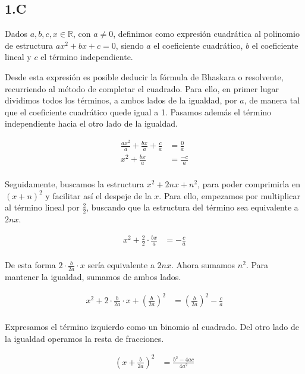 \subsection*{1.C}

Dados $a, b, c, x \in \mathbb{R}$, con $a \neq 0$, definimos como expresión cuadrática al polinomio de estructura $ax^2 + bx + c = 0$, siendo $a$ el coeficiente cuadrático, $b$ el coeficiente lineal y $c$ el término independiente.

Desde esta expresión es posible deducir la fórmula de Bhaskara o resolvente, recurriendo al método de completar el cuadrado. Para ello, en primer lugar dividimos todos los términos, a ambos lados de la igualdad, por $a$, de manera tal que el coeficiente cuadrático quede igual a 1. Pasamos además el término independiente hacia el otro lado de la igualdad.

\begin{align*}
	\frac{ax^2}{a} + \frac{bx}{a} + \frac{c}{a} &= \frac{0}{a}\\
	x^2 + \frac{bx}{a} &= \frac{-c}{a}\\
\end{align*}

Seguidamente, buscamos la estructura $x^2 + 2nx + n^2$, para poder comprimirla en $(x+n)^2$ y facilitar así el despeje de la $x$. Para ello, empezamos por multiplicar al término lineal por $\frac{2}{2}$, buscando que la estructura del término sea equivalente a $2nx$.

\begin{align*}
	x^2 + \frac{2}{2} \cdot \frac{bx}{a} &= - \frac{c}{a}\\
\end{align*}

De esta forma $2 \cdot \frac{b}{2a} \cdot x$ sería equivalente a $2nx$. Ahora sumamos $n^2$. Para mantener la igualdad, sumamos de ambos lados.

\begin{align*}
	x^2 + 2 \cdot \frac{b}{2a} \cdot x + \left(\frac{b}{2a}\right)^2 &= \left(\frac{b}{2a}\right)^2 - \frac{c}{a}\\
\end{align*}

Expresamos el término izquierdo como un binomio al cuadrado. Del otro lado de la igualdad operamos la resta de fracciones.

\begin{align*}
	\left(x + \frac{b}{2a}\right)^2 &= \frac{b^2 - 4ac}{4a^2}\\
\end{align*}

